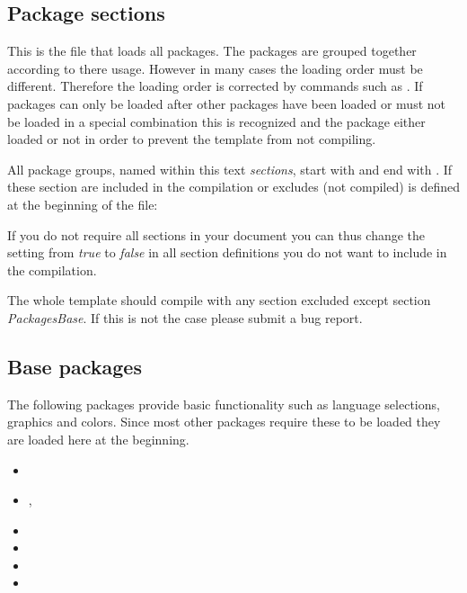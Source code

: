\subsection{Package sections}

This is the file that loads all packages. The packages are grouped together according to there usage. However in many cases the loading order must be different. Therefore the loading order is corrected by commands such as . If packages can only be loaded after other packages have been loaded or must not be loaded in a special combination this is recognized and the package either loaded or not in order to prevent the template from not compiling. 

All package groups, named within this text \emph{sections}, start with  and end with . If these section are included in the compilation or excludes (not compiled) is defined at the beginning of the file:


If you do not require all sections in your document you can thus change the setting from \emph{true} to \emph{false} in all section definitions you do not want to include in the compilation.

The whole template should compile with any section excluded except section \emph{PackagesBase}. If this is not the case please submit a bug report.

\subsection{Base packages}
\label{sec:packages:base}
The following packages provide basic functionality such as language selections, graphics and colors. Since most other packages require these to be loaded they are loaded here at the beginning. 

\begin{itemize}[noitemsep]
\item {}
\item {}, 
\item {}
\item {}
\item {}
\item {}
\end{itemize}

